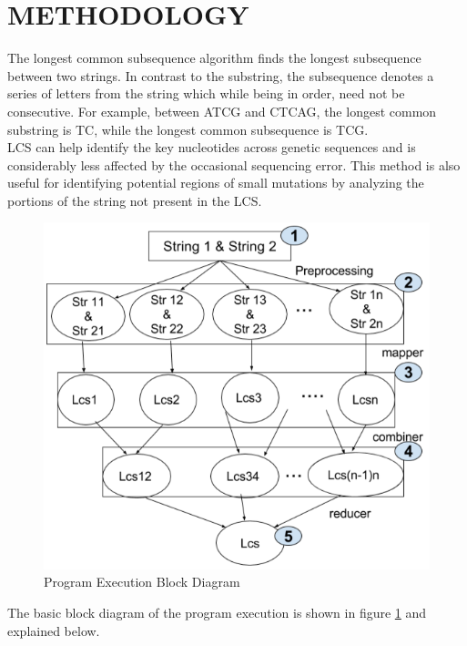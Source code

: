 \documentclass[journal,twoside]{IEEEtran}
\begin{document}
\section{METHODOLOGY}
The longest common subsequence algorithm finds the longest subsequence between two strings. In contrast to the substring, the subsequence denotes a series of letters from the string which while being in order, need not be consecutive. For example, between ATCG and CTCAG, the longest common substring is TC, while the longest common subsequence is TCG. 
\\
LCS can help identify the key nucleotides across genetic sequences and is considerably less affected by the occasional sequencing error. This method is also useful for identifying potential regions of small mutations by analyzing the portions of the string not present in the LCS.
\\

\begin{figure}[h]
\centering
\includegraphics[scale=0.35]{flow-diagram}
\caption{Program Execution Block Diagram}
\label{fig:flow_diagram}
\end{figure}

The basic block diagram of the program execution is shown in figure \ref{fig:flow_diagram} and explained below.
\end{document}
